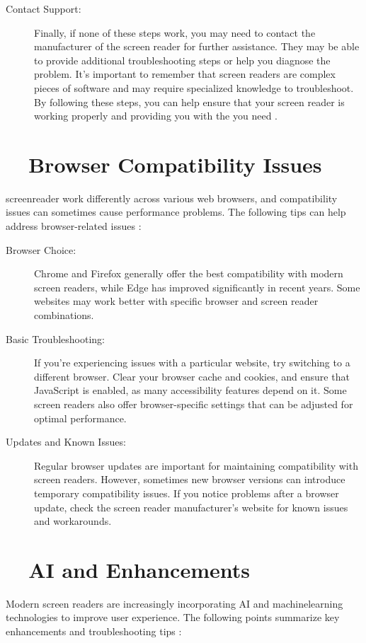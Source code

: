 \begin{description}
	\item[Contact Support:] Finally, if none of these steps work, you may need to contact the manufacturer of the screen reader for further assistance. They may be able to provide additional troubleshooting steps or help you diagnose the problem. It's important to remember that screen readers are complex pieces of software and may require specialized knowledge to troubleshoot. By following these steps, you can help ensure that your screen reader is working properly and providing you with the  you need \cite{FreedomScientificJAWS, NVAccess, MicrosoftAccessibility}.
\end{description}

\section{~~Browser Compatibility Issues}
\label{app1:browser}
\gls{screenreader} work differently across various web browsers, and compatibility issues can sometimes cause performance problems. The following tips can help address browser-related issues \cite{WebAIMSurvey}:

\begin{description}
	\item[Browser Choice:] Chrome and Firefox generally offer the best compatibility with modern screen readers, while Edge has improved significantly in recent years. Some websites may work better with specific browser and screen reader combinations.
	\item[Basic Troubleshooting:] If you're experiencing issues with a particular website, try switching to a different browser. Clear your browser cache and cookies, and ensure that JavaScript is enabled, as many accessibility features depend on it. Some screen readers also offer browser-specific settings that can be adjusted for optimal performance.
	\item[Updates and Known Issues:] Regular browser updates are important for maintaining compatibility with screen readers. However, sometimes new browser versions can introduce temporary compatibility issues. If you notice problems after a browser update, check the screen reader manufacturer's website for known issues and workarounds.
\end{description}

\section{~~AI and  Enhancements}
\label{app1:ai}
Modern screen readers are increasingly incorporating \gls{AI} and \gls{machinelearning} technologies to improve user experience. The following points summarize key enhancements and \gls{troubleshooting} tips \cite{MicrosoftAIAccessibility, Kim2023}:


